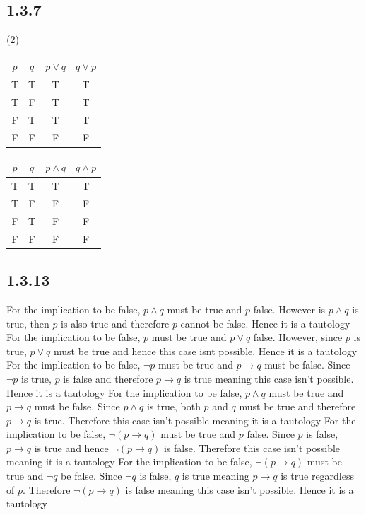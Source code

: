 \documentclass[12pt,titlepage]{extarticle}
\begin{document}
\subsection*{1.3.7}
\begin{tasks}(2)
    \task\begin{tabular}{c|c||c||c}
        $p$ & $q$ & $p \lor q$ & $q \lor p$ \\\hline
        T & T & T & T \\\hline
        T & F & T & T \\\hline
        F & T & T & T \\\hline
        F & F & F & F
    \end{tabular}

    \task\begin{tabular}{c|c||c||c}
        $p$ & $q$ & $p \land q$ & $q \land p$ \\\hline
        T & T & T & T \\\hline
        T & F & F & F \\\hline
        F & T & F & F \\\hline
        F & F & F & F
    \end{tabular}
\end{tasks}

\subsection*{1.3.13}
\begin{tasks}
    \task For the implication to be false, $p \land q$ must be true and $p$ false. However is $p \land q$ is true, then $p$ is also true and therefore $p$ cannot be false. Hence it is a tautology
    \task For the implication to be false, $p$ must be true and $p \lor q$ false. However, since $p$ is true, $p \lor q$ must be true and hence this case isnt possible. Hence it is a tautology
    \task For the implication to be false, $\lnot p$ must be true and $p \to q$ must be false. Since $\lnot p$ is true, $p$ is false and therefore $p \to q$ is true meaning this case isn't possible. Hence it is a tautology
    \task For the implication to be false, $p \land q$ must be true and $p \to q$ must be false. Since $p \land q$ is true, both $p$ and $q$ must be true and therefore $p \to q$ is true. Therefore this case isn't possible meaning it is a tautology
    \task For the implication to be false, $\lnot (p \to q)$ must be true and $p$ false. Since $p$ is false, $p \to q$ is true and hence $\lnot (p \to q)$ is false. Therefore this case isn't possible meaning it is a tautology
    \task For the implication to be false, $\lnot (p \to q)$ must be true and $\lnot q$ be false. Since $\lnot q$ is false, $q$ is true meaning $p \to q$ is true regardless of $p$. Therefore $\lnot (p \to q)$ is false meaning this case isn't possible. Hence it is a tautology
\end{tasks}
\end{document}
